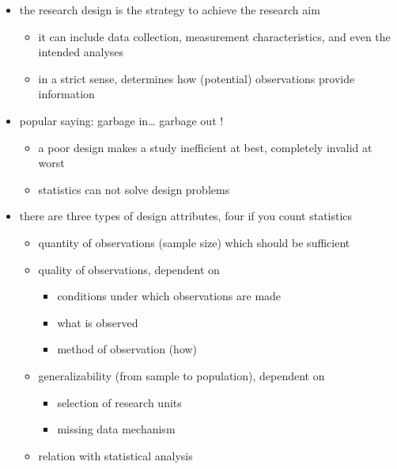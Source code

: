 \documentclass[]{article}
\providecommand{\tightlist}{%
  \setlength{\itemsep}{0pt}\setlength{\parskip}{0pt}}
\begin{document}
\begin{itemize}
\tightlist
\item
  the research design is the strategy to achieve the research aim

  \begin{itemize}
  \tightlist
  \item
    it can include data collection, measurement characteristics, and
    even the intended analyses
  \item
    in a strict sense, determines how (potential) observations provide
    information \\
  \end{itemize}
\item
  popular saying: garbage in\ldots{} garbage out !

  \begin{itemize}
  \tightlist
  \item
    a poor design makes a study inefficient at best, completely invalid
    at worst
  \item
    statistics can not solve design problems\\
  \end{itemize}
\item
  there are three types of design attributes, four if you count
  statistics

  \begin{itemize}
  \tightlist
  \item
    quantity of observations (sample size) which should be sufficient
  \item
    quality of observations, dependent on

    \begin{itemize}
    \tightlist
    \item
      conditions under which observations are made
    \item
      what is observed
    \item
      method of observation (how)
    \end{itemize}
  \item
    generalizability (from sample to population), dependent on

    \begin{itemize}
    \tightlist
    \item
      selection of research units
    \item
      missing data mechanism
    \end{itemize}
  \item
    relation with statistical analysis
  \end{itemize}
\end{itemize}
\end{document}
